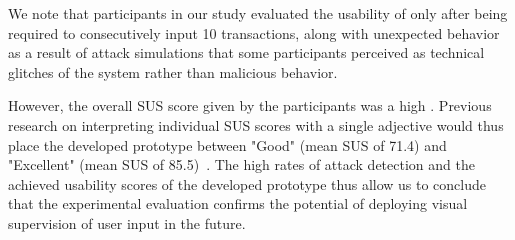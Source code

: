 We note that participants in our study evaluated the usability of \sysname only after being required to consecutively input 10 transactions, along with unexpected behavior as a result of attack simulations that some participants perceived as technical glitches of the system rather than malicious behavior.

However, the overall SUS score given by the participants was a high \textbf{}.
Previous research on interpreting individual SUS scores with a single adjective would thus place the developed prototype between "Good" (mean SUS of 71.4) and "Excellent" (mean SUS of 85.5)~\cite{interpretingSUS}.
The high rates of attack detection and the achieved usability scores of the developed prototype thus allow us to conclude that the experimental evaluation confirms the potential of deploying visual supervision of user input in the future.



